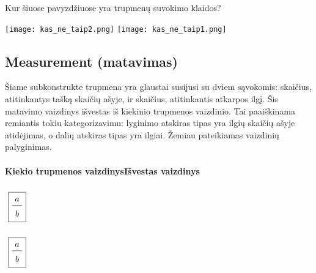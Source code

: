 \documentclass[a4paper]{article}
\begin{document}
Kur šiuose pavyzdžiuose yra trupmenų suvokimo klaidos?

\texttt{[image: kas\_ne\_taip2.png]}
\texttt{[image: kas\_ne\_taip1.png]}

\subsection{Measurement (matavimas)} 
Šiame subkonstrukte trupmena yra glaustai susijusi su dviem sąvokomis: skaičius, atitinkantys tašką skaičių ašyje, ir skaičius, atitinkantis atkarpos ilgį.  Šis matavimo vaizdinys išvestas iš kiekinio trupmenos vaizdinio. Tai paaiškinama remiantis tokiu kategorizavimu: lyginimo atskiras tipas yra ilgių skaičių ašyje atidėjimas, o dalių atskiras tipas yra ilgiai. Žemiau pateikiamas vaizdinių palyginimas.\\ \\
\phantom{xxxxxxxxxx}\textbf{Kiekio trupmenos vaizdinys}\phantom{xxxxxxxxxxxxxxxxxxxxxxx}\textbf{Išvestas vaizdinys}\\ \\
\phantom{xxxxxxxxxxxxxxx}$\tikz[baseline]{\node(d30) {\boxed{\frac{\tikz[baseline]{\node(d28) {$a$}}}{\tikz[baseline]{\node(d29){$b$}}}}}}$
\phantom{xxxxxxxxxxxxxxxxxxxxxxxxxxxxxxxxxxxxxxxxxxx}$\tikz[baseline]{\node(d28) {\boxed{\frac{\tikz[baseline]{\node(d26) {$a$}}}{\tikz[baseline]{\node(d27){$b$}}}}}}$
\end{document}
